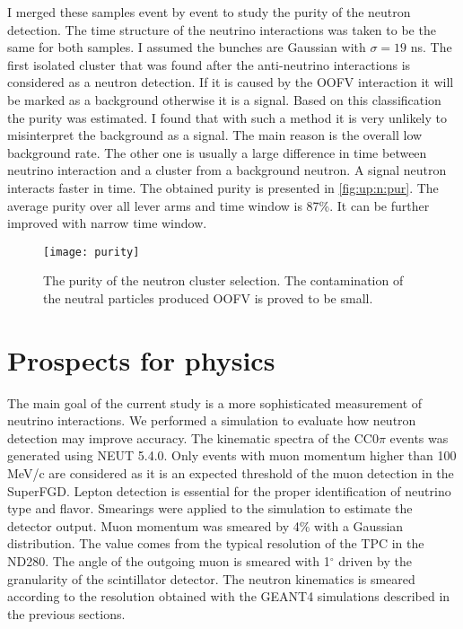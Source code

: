 \documentclass[main.tex]{subfiles}
\begin{document}
I merged these samples event by event to study the purity of the neutron detection. The time structure of the neutrino interactions was taken to be the same for both samples. I assumed the bunches are Gaussian with $\sigma=19$ ns.  The first isolated cluster that was found after the anti-neutrino interactions is considered as a neutron detection. If it is caused by the OOFV interaction it will be marked as a background otherwise it is a signal. Based on this classification the purity was estimated. I found that with such a method it is very unlikely to misinterpret the background as a signal. The main reason is the overall low background rate. The other one is usually a large difference in time between neutrino interaction and a cluster from a background neutron. A signal neutron interacts faster in time. The obtained purity is presented in \autoref{fig:up:n:pur}. The average purity over all lever arms and time window is 87\%. It can be further improved with narrow time window.

\begin{figure}[!ht]
  \centering
  \texttt{[image: purity]}
  \caption{The purity of the neutron cluster selection. The contamination of the neutral particles produced OOFV is proved to be small.}
  \label{fig:up:n:pur}
\end{figure}


\section{Prospects for physics}
\label{sec:up:n:phys}
The main goal of the current study is a more sophisticated measurement of neutrino interactions. We performed a simulation to evaluate how neutron detection may improve accuracy. The kinematic spectra of the CC0$\pi$ events was generated using NEUT 5.4.0. Only events with muon momentum higher than 100 MeV/c are considered as it is an expected threshold of the muon detection in the SuperFGD. Lepton detection is essential for the proper identification of neutrino type and flavor. Smearings were applied to the simulation to estimate the detector output. Muon momentum was smeared by 4\% with a Gaussian distribution. The value comes from the typical resolution of the TPC in the ND280. The angle of the outgoing muon is smeared with 1${}^\circ$ driven by the granularity of the scintillator detector. The neutron kinematics is smeared according to the resolution obtained with the GEANT4 simulations described in the previous sections.
\end{document}
